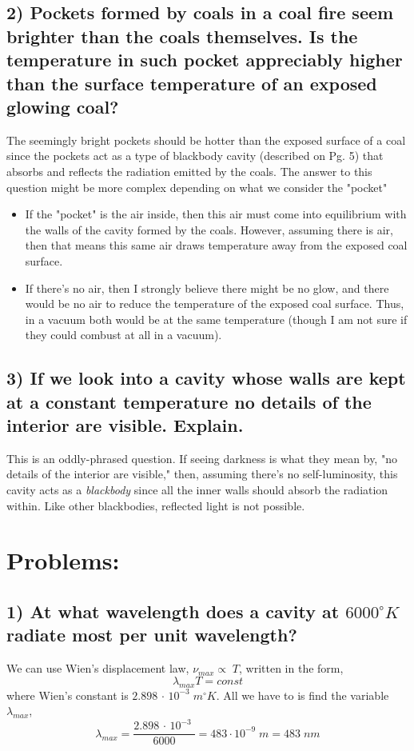 \documentclass[12pt]{report}
\begin{document}
\subsection*{2) Pockets formed by coals in a coal fire seem brighter than the coals themselves. Is the temperature in such pocket appreciably higher than the surface temperature of an exposed glowing coal?}
The seemingly bright pockets should be hotter than the exposed surface of a coal since the pockets act as a type of blackbody cavity (described on Pg. 5) that absorbs and reflects the radiation emitted by the coals. The answer to this question might be more complex depending on what we consider the "pocket"
\begin{itemize}
    \item If the "pocket" is the air inside, then this air must come into equilibrium with the walls of the cavity formed by the coals. However, assuming there is air, then that means this same air draws temperature away from the exposed coal surface.
    \item If there's no air, then I strongly believe there might be no glow, and there would be no air to reduce the temperature of the exposed coal surface. Thus, in a vacuum both would be at the same temperature (though I am not sure if they could combust at all in a vacuum).
\end{itemize}
\subsection*{3) If we look into a cavity whose walls are kept at a constant temperature no details of the interior are visible. Explain.}
This is an oddly-phrased question. If seeing darkness is what they mean by, "no details of the interior are visible," then, assuming there's no self-luminosity, this cavity acts as a \textit{blackbody} since all the inner walls should absorb the radiation within. Like other blackbodies, reflected light is not possible.

\section*{Problems:}
\newcommand{\lambmax}{\lambda_{max}}
\newcommand{\Wiens}{2.898\,\cdot\,10^{-3}\;}
\subsection*{1) At what wavelength does a cavity at \(6000^\circ K\) radiate most per unit wavelength?}
We can use Wien's displacement law, \(\nu_{max} \propto \;T\), written in the form, 
\[\lambmax T = const\]
where Wien's constant is \(\Wiens m^\circ K\). All we have to is find the variable \(\lambmax\),
\[\lambmax = \frac{\Wiens}{6000} = 483 \cdot 10^{-9}\; m = 483\; nm \]
\newcommand{\specrad}{R_T(\nu)}
\newcommand{\enerden}{\rho_T(\nu)}
\newcommand{\phE}{h\nu}
\newcommand{\molE}{kT}
\end{document}
